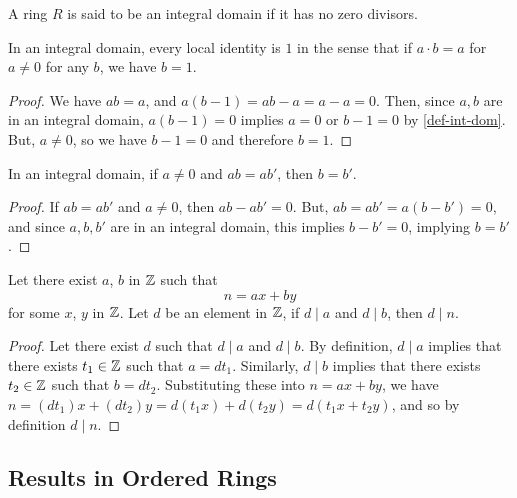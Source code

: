 \begin{definition}\label{def-int-dom}
    A ring $R$ is said to be an integral domain if it has no zero divisors.
\end{definition}

\begin{theorem}\label{local-identity-one-in-int-dom}
In an integral domain, every local identity is $1$ in the sense that if $a \cdot b = a$ for $a \neq 0$ for any $b$, we have $b=1$.
\end{theorem}
\begin{proof}
    We have $ab = a$, and $a(b-1) = ab - a = a - a = 0$. Then, since $a, b$ are in an integral domain, $a(b-1) = 0$ implies $a = 0$ or $b-1 = 0$ by \ref{def-int-dom}. But, $a \neq 0$, so we have $b-1 = 0$ and therefore $b = 1$. 
\end{proof}

\begin{theorem}\label{mult-cancel-in-int-dom}
    In an integral domain, if $a \neq 0$ and $ab = ab'$, then $ b= b'$. 
\end{theorem}
\begin{proof}
    If $ab = ab'$ and $a \neq 0$, then $ab - ab' = 0$. But, $ab = ab' = a(b-b') = 0$, and since $a, b, b'$ are in an integral domain, this implies $b-b' = 0$, implying $b = b'$. 
\end{proof}

\begin{lemma}   \label{linearity}
    Let there exist $a$, $b$ in $\mathbb{Z}$ such that 
    \[n=ax+by\]
    for some $x$, $y$ in $\mathbb{Z}$. Let $d$ be an element in $\mathbb{Z}$, if $d \mid a$ and $d \mid b$, then $d \mid n$.
\end{lemma}
\begin{proof}
    Let there exist $d$ such that $d \mid a$ and $d \mid b$. By definition, $d \mid a$ implies that there exists $t_1 \in \mathbb{Z}$ such that $a=dt_1$. Similarly, $d \mid b$ implies that there exists $t_2 \in \mathbb{Z}$ such that $b=dt_2$. Substituting these into $n=ax+by$, we have $n=(dt_1)x+(dt_2)y = d(t_1x) + d(t_2y) = d(t_1x+t_2y)$, and so by definition $d \mid n$. 
\end{proof}



\subsection{Results in Ordered Rings}

